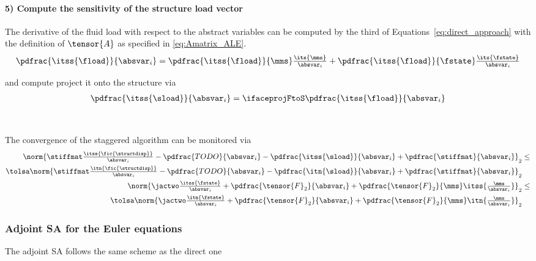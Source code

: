 \documentclass[../main.tex]{subfiles}
\begin{document}
\paragraph{5) Compute the sensitivity of the structure load vector}
The derivative of the fluid load with respect to the abstract variables can be computed by the third of Equations~\eqref{eq:direct_approach} with the definition of $\tensor{A}$ as specified in \eqref{eq:Amatrix_ALE}.
\begin{align}\label{eq:deriv_floadBYabsvar}
\pdfrac{\itss{\fload}}{\absvar_i} =
\pdfrac{\itss{\fload}}{\mms}    \tfrac{\its{\mms}}   {\absvar_i} +
\pdfrac{\itss{\fload}}{\fstate} \tfrac{\its{\fstate}}{\absvar_i}
\end{align}

and compute project it onto the structure via
\begin{align}
\pdfrac{\itss{\sload}}{\absvar_i} = \ifaceprojFtoS \pdfrac{\itss{\fload}}{\absvar_i}
\end{align}
~\\
~\\
The convergence of the staggered algorithm can be monitored via
\begin{align}
\begin{split}
  \norm{ \stiffmat \tfrac{ \itss{\fic{\structdisp}} }{\absvar_i}  -  \pdfrac{TODO}{\absvar_i} - \pdfrac{\itss{\sload}}{\absvar_i}  +  \pdfrac{\stiffmat}{\absvar_i}}_{2} &
  \leq \\
  \tolsa \norm{ \stiffmat \tfrac{ \itn{\fic{\structdisp}}  }{\absvar_i}  -  \pdfrac{TODO}{\absvar_i} - \pdfrac{\itn{\sload}}{\absvar_i}  +  \pdfrac{\stiffmat}{\absvar_i}}_{2} &
\end{split} &
\\
\begin{split}
  \norm{\jactwo \tfrac{\itss{\fstate}}{\absvar_i} + \pdfrac{\tensor{F}_2}{\absvar_i} + \pdfrac{\tensor{F}_2}{\mms} \itss{\tfrac{\mms}{\absvar_i} }   }_{2} &
  \leq \\
  \tolsa \norm{\jactwo \tfrac{\itn{\fstate}}{\absvar_i} + \pdfrac{\tensor{F}_2}{\absvar_i} + \pdfrac{\tensor{F}_2}{\mms} \itn{\tfrac{\mms}{\absvar_i} }   }_{2} &
\end{split} &
\end{align}


\subsubsection{Adjoint \acl{SA} for the Euler equations}\label{sec:adjoint_sa}
The adjoint SA follows the same scheme as the direct one
\end{document}
